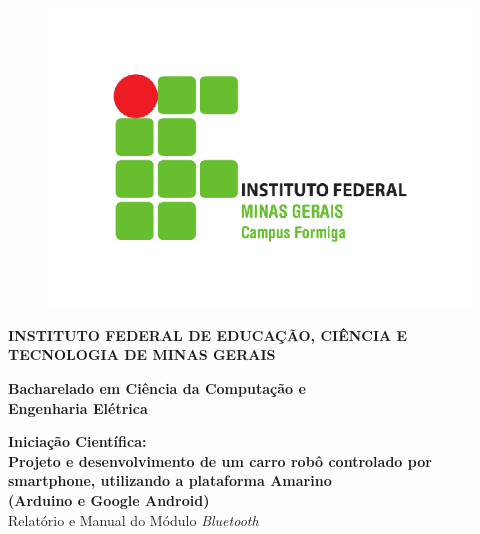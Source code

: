 \documentclass[portugues, brazil, a4paper,12pt]{article}
\begin{document}
\begin{titlepage}

  \vfill

\begin{figure}[H]
  \centering
  \includegraphics[scale=0.45]{logo.jpg}
\end{figure}

  \vfill

  \begin{center}
    \begin{Large}
      \textbf{INSTITUTO FEDERAL DE EDUCAÇÃO, CIÊNCIA E TECNOLOGIA DE MINAS GERAIS}
    \end{Large}
  \end{center}

  \begin{center}
    \begin{large}
      \textbf{Bacharelado em Ciência da Computação e\\ Engenharia Elétrica} \\[1.4cm] 
    \end{large}
  \end{center}

  \vfill

  \begin{center}
    \begin{large}
      \textbf{Iniciação Científica: \\ Projeto e desenvolvimento de um carro robô controlado por smartphone, utilizando a plataforma Amarino \\ (Arduino e Google Android)} \\
      Relatório e Manual do Módulo \textit{Bluetooth}
    \end{large}
  \end{center}


\end{titlepage}
\end{document}
